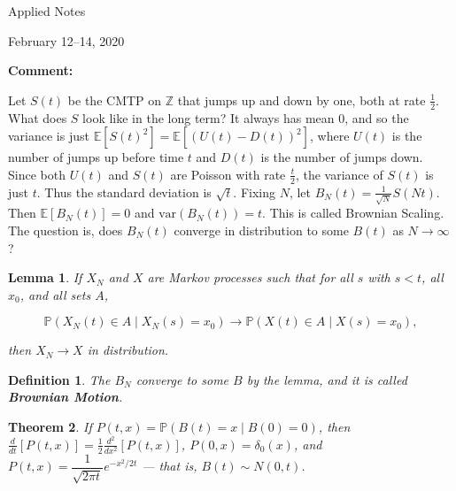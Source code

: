 \documentclass{article}
\theoremstyle{colontheorem}
\newtheorem{theorem}{Theorem}[section]
\newtheorem{definition}[theorem]{Definition}
\newtheorem{lemma}{Lemma}[theorem]
\newenvironment{Theorem}
{
	\begin{mdframed}[backgroundcolor=TheoremOrange!10]
	\begin{theorem}
}
{
	\end{theorem}
	\end{mdframed}
	
	\vspace{.15in}
}
\newenvironment{Def}
{
	\begin{mdframed}[backgroundcolor=DefGreen!10]
	\begin{definition}
}
{
	\end{definition}
	\end{mdframed}
	
	\vspace{.15in}
}
\newenvironment{Lemma}
{
	\begin{mdframed}[backgroundcolor=LemmaYellow!10]
	\begin{lemma}
}
{
	\end{lemma}
	\end{mdframed}
	
	\vspace{.03in}
}
\newenvironment{Comment}
{
	\begin{mdframed}[backgroundcolor=CommentBlue!10]
	\textbf{Comment:}%
}
{
	\end{mdframed}
	
	\vspace{.15in}
}
\begin{document}
\vspace*{.5in}

\begin{center}
	\Huge Applied Notes\\
	
	\vspace{.25in}
	
	\normalsize February 12--14, 2020
\end{center}

\vspace{.25in}



\begin{Comment}
	Let $S(t)$ be the CMTP on $\mathbb{Z}$ that jumps up and down by one, both at rate $\frac{1}{2}$. What does $S$ look like in the long term? It always has mean $0$, and so the variance is just $\mathbb{E}[S(t)^2] = \mathbb{E}[(U(t) - D(t))^2]$, where $U(t)$ is the number of jumps up before time $t$ and $D(t)$ is the number of jumps down. Since both $U(t)$ and $S(t)$ are Poisson with rate $\frac{t}{2}$, the variance of $S(t)$ is just $t$. Thus the standard deviation is $\sqrt{t}$. Fixing $N$, let $B_N(t) = \frac{1}{\sqrt{N}} S(Nt)$. Then $\mathbb{E}[B_N(t)] = 0$ and $\text{var}(B_N(t)) = t$. This is called Brownian Scaling. The question is, does $B_N(t)$ converge in distribution to some $B(t)$ as $N \longrightarrow \infty$?
	
\end{Comment}



\begin{Lemma}
	
	If $X_N$ and $X$ are Markov processes such that for all $s$ with $s < t$, all $x_0$, and all sets $A$,
	
	$$
		\mathbb{P}(X_N(t) \in A \mid X_N(s) = x_0) \longrightarrow \mathbb{P}(X(t) \in A \mid X(s) = x_0),
	$$
	
	then $X_N \longrightarrow X$ in distribution.
	
\end{Lemma}



\begin{Def}
	
	The $B_N$ converge to some $B$ by the lemma, and it is called \textbf{Brownian Motion}.
	
\end{Def}



\begin{Theorem}
	
	If $P(t, x) = \mathbb{P}(B(t) = x \mid B(0) = 0)$, then $\frac{d}{dt} [P(t, x)] = \frac{1}{2} \frac{d^2}{dx^2} [P(t, x)]$, $P(0, x) = \delta_0(x)$, and $P(t, x) = \dfrac{1}{\sqrt{2 \pi t}} e^{-x^2 / 2t}$ --- that is, $B(t) \sim N(0, t)$.
	
\end{Theorem}
\end{document}
